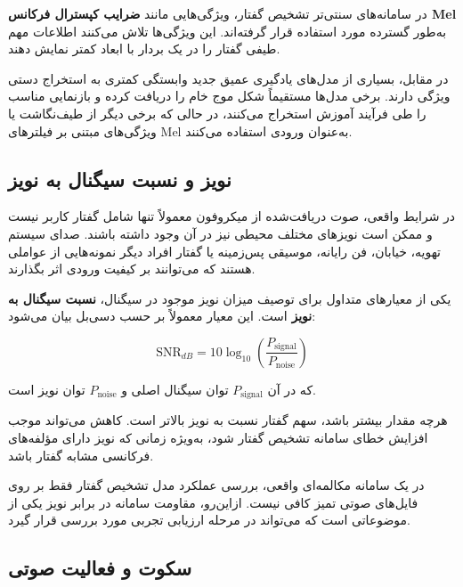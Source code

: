 در سامانه‌های سنتی‌تر تشخیص گفتار، ویژگی‌هایی مانند
\textbf{ضرایب کپسترال فرکانس Mel}
به‌طور گسترده مورد استفاده قرار گرفته‌اند.
این ویژگی‌ها تلاش می‌کنند اطلاعات مهم طیفی گفتار را در یک
بردار با ابعاد کمتر نمایش دهند.

در مقابل، بسیاری از مدل‌های یادگیری عمیق جدید وابستگی کمتری
به استخراج دستی ویژگی دارند.
برخی مدل‌ها مستقیماً شکل موج خام را دریافت کرده و بازنمایی
مناسب را طی فرآیند آموزش استخراج می‌کنند، در حالی که برخی
دیگر از طیف‌نگاشت یا ویژگی‌های مبتنی بر فیلترهای Mel به‌عنوان
ورودی استفاده می‌کنند.


\subsection{نویز و نسبت سیگنال به نویز}

در شرایط واقعی، صوت دریافت‌شده از میکروفون معمولاً تنها شامل
گفتار کاربر نیست و ممکن است نویزهای مختلف محیطی نیز در آن
وجود داشته باشند.
صدای سیستم تهویه، خیابان، فن رایانه، موسیقی پس‌زمینه یا
گفتار افراد دیگر نمونه‌هایی از عواملی هستند که می‌توانند بر
کیفیت ورودی اثر بگذارند.

یکی از معیارهای متداول برای توصیف میزان نویز موجود در سیگنال،
\textbf{نسبت سیگنال به نویز}
است.
این معیار معمولاً بر حسب دسی‌بل بیان می‌شود:

\begin{equation}
\mathrm{SNR}_{dB}
=
10
\log_{10}
\left(
\frac{P_{\mathrm{signal}}}
     {P_{\mathrm{noise}}}
\right)
\end{equation}

که در آن $P_{\mathrm{signal}}$ توان سیگنال اصلی و
$P_{\mathrm{noise}}$ توان نویز است.

هرچه مقدار  بیشتر باشد، سهم گفتار نسبت به نویز بالاتر
است.
کاهش  می‌تواند موجب افزایش خطای سامانه تشخیص گفتار شود،
به‌ویژه زمانی که نویز دارای مؤلفه‌های فرکانسی مشابه گفتار باشد.

در یک سامانه مکالمه‌ای واقعی، بررسی عملکرد مدل تشخیص گفتار
فقط بر روی فایل‌های صوتی تمیز کافی نیست.
ازاین‌رو، مقاومت سامانه در برابر نویز یکی از موضوعاتی است که
می‌تواند در مرحله ارزیابی تجربی مورد بررسی قرار گیرد.


\subsection{سکوت و فعالیت صوتی}

